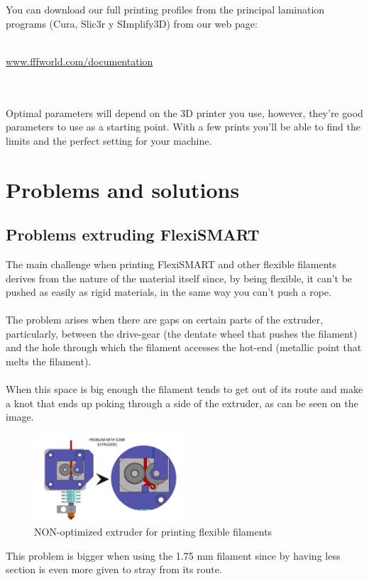 \documentclass[11pt,a4paper]{article}
\begin{document}
You can download our full printing profiles from the principal lamination programs (Cura, Slic3r y SImplify3D) from our web page:
\\\\
\centerline{ {\huge \url{www.fffworld.com/documentation} } }
\\\\
Optimal parameters will depend on the 3D printer you use, however, they’re good parameters to use as a starting point. With a few prints you’ll be able to find the limits and the perfect setting for your machine.
\section{Problems and solutions}
	\subsection{Problems extruding FlexiSMART}
The main challenge when printing FlexiSMART and other flexible filaments derives from the nature of the material itself since, by being flexible, it can’t be pushed as easily as rigid materials, in the same way you can’t push a rope.
\\\\
The problem arises when there are gaps on certain parts of the extruder, particularly, between the drive-gear (the dentate wheel that pushes the filament) and the hole through which the filament accesses the hot-end (metallic point that melts the filament).
\\\\
When this space is big enough the filament tends to get out of its route and make a knot that ends up poking through a side of the extruder, as can be seen on the image.
\begin{figure}[H]
\centering
\includegraphics[width=0.5\textwidth,cfbox=azul_marcos 4pt 0pt]{FOTOS/NUDOS1}
\caption*{NON-optimized extruder for printing flexible filaments}
\end{figure}
This problem is bigger when using the 1.75 mm filament since by having less section is even more given to stray from its route.
\end{document}
